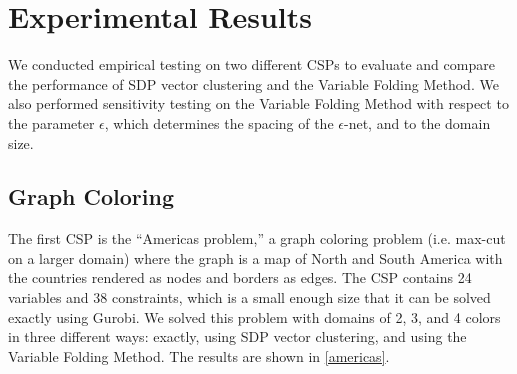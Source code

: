 \documentclass[12pt]{article} %
\begin{document}
\section{Experimental Results}

We conducted empirical testing on two different CSPs to evaluate and compare the performance of SDP vector clustering and the Variable Folding Method. We also performed sensitivity testing on the Variable Folding Method with respect to the parameter $\epsilon$, which determines the spacing of the $\epsilon$-net, and to the domain size.

\subsection{Graph Coloring}

The first CSP is the ``Americas problem,'' a graph coloring problem (i.e. max-cut on a larger domain) where the graph is a map of North and South America with the countries rendered as nodes and borders as edges. The CSP contains 24 variables and 38 constraints, which is a small enough size that it can be solved exactly using Gurobi. We solved this problem with domains of 2, 3, and 4 colors in three different ways: exactly, using SDP vector clustering, and using the Variable Folding Method. The results are shown in \autoref{americas}. 
\end{document}
